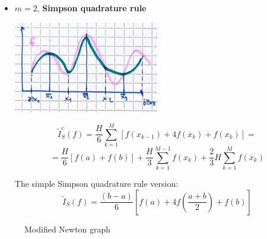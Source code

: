 \begin{itemize}
    \item $m=2$, \textbf{Simpson quadrature rule}
    \begin{center}
        \includegraphics[width=0.5\textwidth]{images/quadrature_m2.png}
    \end{center}
    \begin{LARGE}
        $$
        \tilde{I}_{S}^c(f)=
        \frac{H}{6}
        \sum_{k=1}^M
        \left[
            f(x_{k-1})+4f(\overline{x}_k)+f(x_k)
        \right]=
        $$
        $$
        =
        \frac{H}{6}
        \left[f(a)+f(b)\right]+
        \frac{H}{3}
        \sum_{k=1}^{M-1}f(x_k)+
        \frac{2}{3}H
        \sum_{k=1}^{M}f(\overline{x}_k)
        $$
    \end{LARGE}
    The simple Simpson quadrature rule version:
    $$
    \tilde{I}_S(f)=\frac{(b-a)}{6}\left[
        f(a)+
        4f\left(\frac{a+b}{2}\right)+f(b)
    \right]
    $$

\end{itemize}
\pagebreak
\begin{figure}[!ht]
    \begin{minipage}{\linewidth}
        \centering
        \caption{Modified Newton graph}
    \end{minipage}
\end{figure}

